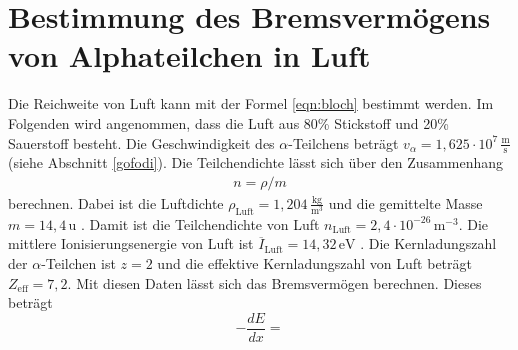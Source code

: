 \section{Bestimmung des Bremsvermögens von Alphateilchen in Luft}
Die Reichweite von Luft kann mit der Formel \eqref{eqn:bloch} bestimmt werden.
Im Folgenden wird angenommen, dass die Luft aus 80\% Stickstoff und 20\% Sauerstoff besteht.
Die Geschwindigkeit des $\alpha$-Teilchens beträgt $v_{\alpha}= 1,625\cdot10^{7}\,\frac{\text{m}}{\text{s}}$ (siehe Abschnitt \ref{gofodi}).
Die Teilchendichte lässt sich über den Zusammenhang
\begin{align*}
  n = \rho/m
\end{align*}
berechnen.
Dabei ist die Luftdichte $\rho_{\text{Luft}} = 1,204\,\frac{\text{kg}}{\text{m}^3}$ \cite{chem2} und die gemittelte Masse
$m = 14,4 \,\text{u}$ \cite{PSE}.
Damit ist die Teilchendichte von Luft $n_{\text{Luft}} = 2,4\cdot10^{-26}\,\text{m}^{-3}$.
Die mittlere Ionisierungsenergie von Luft ist
$\overline{I}_{\text{Luft}} = 14,32\,\text{eV}$ \cite{PSE}.
Die Kernladungszahl der $\alpha$-Teilchen ist $z=2$ und die effektive Kernladungszahl von Luft beträgt
$Z_{\text{eff}} = 7,2$.
Mit diesen Daten lässt sich das Bremsvermögen berechnen. Dieses beträgt
\begin{equation*}
  -\frac{dE}{dx} =
\end{equation*}
